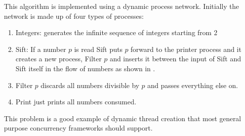 \documentclass[12pt,twoside,notitlepage]{report}
\theoremstyle{plain}%
\theoremstyle{definition}
\theoremstyle{remark}
\begin{document}
This algorithm is implemented using a dynamic process network. Initially the network is made up of four types of processes:
\begin{enumerate}
\item{Integers: generates the infinite sequence of integers starting from 2}
\item{Sift: If a number $ p $ is read Sift puts $ p $ forward to the printer process and it creates a new process, Filter $ p $ and inserts it between the input of Sift and Sift itself in the flow of numbers as shown in . }
\item{Filter $ p $ discards all numbers divisible by $ p $ and passes everything else on.}
\item{Print just prints all numbers consumed.}
\end{enumerate}

This problem is a good example of dynamic thread creation that most general purpose concurrency frameworks should support.
\end{document}
